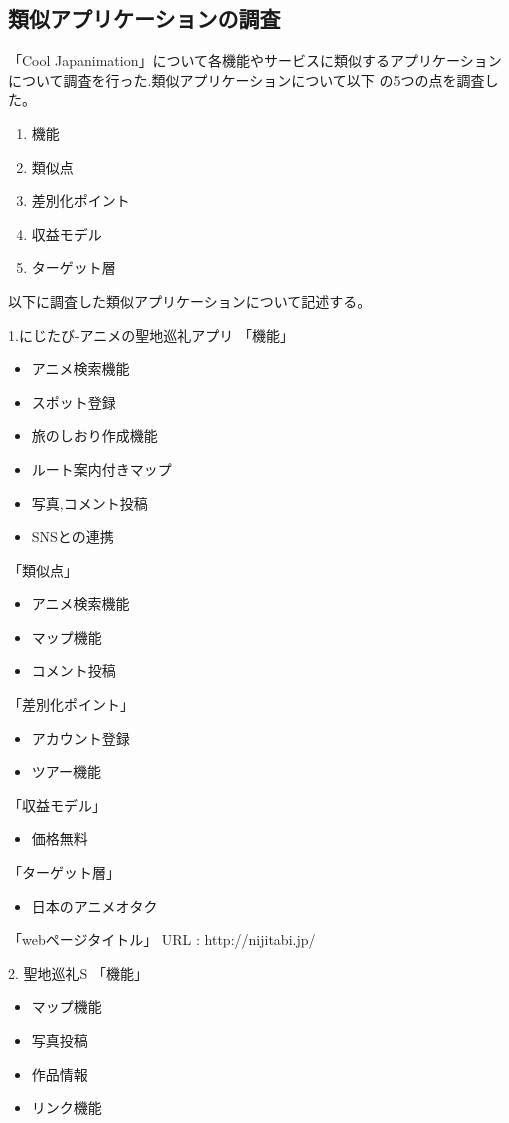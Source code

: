 \subsection{類似アプリケーションの調査}
\par
「Cool Japanimation」について各機能やサービスに類似するアプリケーションについて調査を行った.類似アプリケーションについて以下
の5つの点を調査した。
\begin{enumerate}
\item 機能
\item 類似点
\item 差別化ポイント
\item 収益モデル
\item ターゲット層
\end{enumerate}
\par
以下に調査した類似アプリケーションについて記述する。
\par
1.にじたび-アニメの聖地巡礼アプリ
「機能」
\begin{itemize}
\item アニメ検索機能
\item スポット登録
\item 旅のしおり作成機能
\item ルート案内付きマップ
\item 写真,コメント投稿
\item SNSとの連携
\end{itemize}
「類似点」
\begin{itemize}
\item アニメ検索機能
\item マップ機能
\item コメント投稿
\end{itemize}
「差別化ポイント」
\begin{itemize}
\item アカウント登録
\item ツアー機能
\end{itemize}
「収益モデル」
\begin{itemize}
\item 価格無料
\end{itemize}
「ターゲット層」
\begin{itemize}
\item 日本のアニメオタク
\end{itemize}
「webページタイトル」
URL : http://nijitabi.jp/
\par 
2. 聖地巡礼S
「機能」
\begin{itemize}
\item マップ機能
\item 写真投稿
\item 作品情報
\item リンク機能
\end{itemize}
